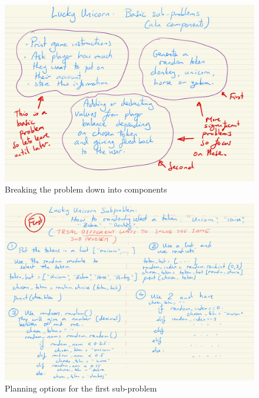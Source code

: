 \documentclass[a4paper,12pt]{article}
\begin{document}
\begin{figure} [!h]
	\centering
	\includegraphics[width=15cm]{iterative_processes/Lucky_Unicorn_Sub_problems_1.pdf}
	\caption*{Breaking the problem down into components}
\end{figure}

\begin{figure} [!h]
	\centering
	\includegraphics[width=15cm]{iterative_processes/Lucky_Unicorn_Sub_problems_2.pdf}
	\caption*{Planning options for the first sub-problem}
\end{figure}

\newpage
\end{document}
